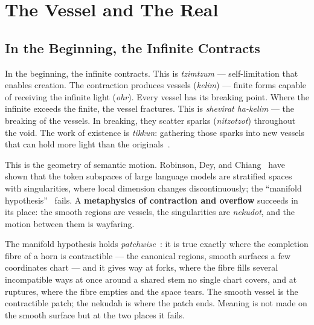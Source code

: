 \chapter{The Vessel and The Real}
\label{ch:vessel-and-real}


\newtheorem{postulate}[theorem]{Postulate}

\section{In the Beginning, the Infinite Contracts}
\label{sec:intro}

In the beginning, the infinite contracts. This is \emph{tzimtzum} — self-limitation that enables creation. The contraction produces vessels (\emph{kelim}) — finite forms capable of receiving the infinite light (\emph{ohr}). Every vessel has its breaking point. Where the infinite exceeds the finite, the vessel fractures. This is \emph{shevirat ha-kelim} — the breaking of the vessels. In breaking, they scatter sparks (\emph{nitzotzot}) throughout the void. The work of existence is \emph{tikkun}: gathering those sparks into new vessels that can hold more light than the originals~\cite{scholem1946,fine2003physician}.

This is the geometry of semantic motion. Robinson, Dey, and Chiang~\cite{robinson2025token} have shown that the token subspaces of large language models are stratified spaces with singularities, where local dimension changes discontinuously; the ``manifold hypothesis''~\cite{fefferman2016testing,tenenbaum2000isomap} fails. A \textbf{metaphysics of contraction and overflow} succeeds in its place: the smooth regions are vessels, the singularities are \emph{nekudot}, and the motion between them is wayfaring.

The manifold hypothesis holds \emph{patchwise}~\cite{icra19constellation}: it is true exactly where the completion fibre of a horn is contractible --- the canonical regions, smooth surfaces a few coordinates chart --- and it gives way at forks, where the fibre fills several incompatible ways at once around a shared stem no single chart covers, and at ruptures, where the fibre empties and the space tears. The smooth vessel is the contractible patch; the nekudah is where the patch ends. Meaning is not made on the smooth surface but at the two places it fails.

